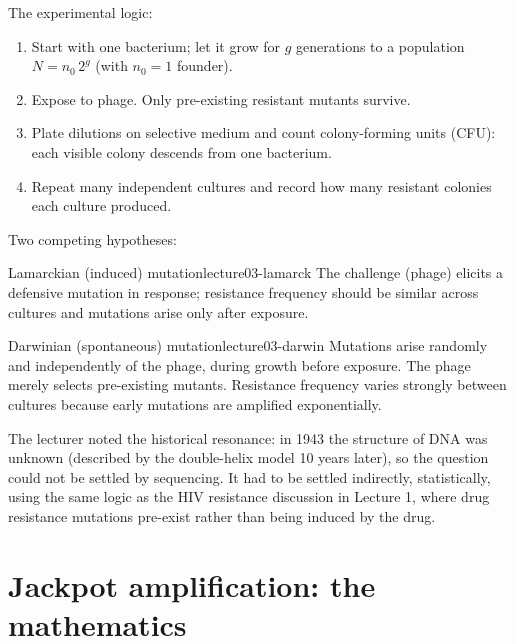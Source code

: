 The experimental logic:
\begin{enumerate}[nosep]
\item Start with one bacterium; let it grow for $g$ generations to a population $N = n_0\,2^{g}$ (with $n_0=1$ founder).
\item Expose to phage. Only pre-existing resistant mutants survive.
\item Plate dilutions on selective medium and count colony-forming units (CFU): each visible colony descends from one bacterium.
\item Repeat many independent cultures and record how many resistant colonies each culture produced.
\end{enumerate}

Two competing hypotheses:
\begin{definition}{Lamarckian (induced) mutation}{lecture03-lamarck}
The challenge (phage) elicits a defensive mutation in response; resistance frequency should be similar across cultures and mutations arise only after exposure.
\end{definition}
\begin{definition}{Darwinian (spontaneous) mutation}{lecture03-darwin}
Mutations arise randomly and independently of the phage, during growth before exposure. The phage merely selects pre-existing mutants. Resistance frequency varies strongly between cultures because early mutations are amplified exponentially.
\end{definition}

The lecturer noted the historical resonance: in 1943 the structure of DNA was unknown (described by the double-helix model 10 years later), so the question could not be settled by sequencing. It had to be settled indirectly, statistically, using the same logic as the HIV resistance discussion in Lecture 1, where drug resistance mutations pre-exist rather than being induced by the drug.

\section{Jackpot amplification: the mathematics}\label{sec:lecture03-jackpot-math}


